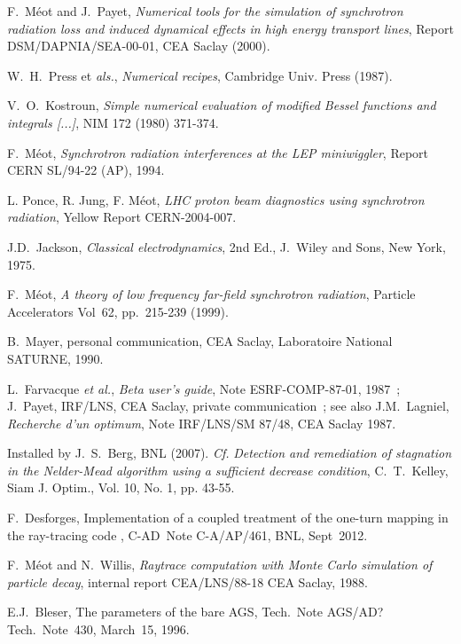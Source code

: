 \begin{thebibliography}{99}
 F.~M\'eot and J.~Payet, 
\textsl{Numerical tools for the simulation of synchrotron radiation  
loss and induced dynamical effects in high energy transport lines},  
Report DSM/DAPNIA/SEA-00-01, CEA Saclay (2000). 

 W.~H.~Press et {\it als.}, \textsl{Numerical recipes}, Cambridge Univ. Press (1987).  

 V.~O.~Kostroun, 
\textsl{Simple numerical evaluation of modified Bessel functions and integrals [...]}, 
NIM 172 (1980) 371-374. 

 F.~M\'eot, \textsl{Synchrotron radiation interferences at the LEP miniwiggler}, 
Report CERN SL/94-22 (AP), 1994. 

 L. Ponce,  R. Jung, F. M\'eot, 
\textsl{LHC proton beam diagnostics using synchrotron radiation},  
Yellow Report CERN-2004-007. 

 J.D.~Jackson, \textsl{Classical electrodynamics}, 2nd 
Ed., J.~Wiley and Sons, New York, 1975.

 F.~M\'eot, 
\textsl{A theory of low frequency far-field synchrotron radiation}, 
 Particle Accelerators Vol~62, pp.~215-239  (1999). 

 B.~Mayer, personal communication,
CEA Saclay, Laboratoire National SATURNE, 1990. 

 L.~Farvacque \textsl{et al.}, \textsl{Beta user's guide}, Note 
ESRF-COMP-87-01, 1987~; 
J.~Payet, IRF/LNS, CEA Saclay, private communication~; see also J.M.~Lagniel, 
\textsl{Recherche d'un optimum}, Note IRF/LNS/SM 87/48, CEA Saclay 1987.

 Installed by J.~S.~Berg, BNL (2007). \emph{Cf.} \textsl{Detection and remediation of stagnation in the 
Nelder-Mead algorithm using a sufficient decrease condition}, 
  C.~T.~Kelley, Siam J. Optim., Vol. 10, No. 1, pp. 43-55. 

 F.~Desforges, 
Implementation of a coupled treatment of the one-turn mapping in the ray-tracing code \zgoubi, 
C-AD~Note C-A/AP/461, BNL, Sept~2012.

 F.~M\'eot and N.~Willis, \textsl{Raytrace computation with 
Monte Carlo simulation of particle decay}, internal report CEA/LNS/88-18 
CEA Saclay, 1988. 

 E.J.~Bleser, The parameters of the bare AGS, Tech.~Note AGS/AD?Tech.~Note~430, March~15, 1996.


\end{thebibliography}
